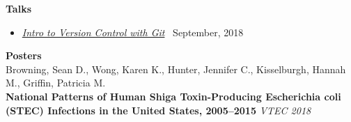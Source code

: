 \documentclass{resume}
\begin{document}
\textbf{Talks}

\begin{itemize}
  \item \href{https://beansrowning.github.io/git-talk}{\textit{Intro to Version Control with Git}} \, September, 2018 \\
\end{itemize}

\textbf{Posters} \\

Browning, Sean D., Wong, Karen K., Hunter, Jennifer C., Kisselburgh, Hannah M., Griffin, Patricia M. \\ 
\textbf{National Patterns of Human Shiga Toxin-Producing Escherichia coli (STEC) Infections in the United States, 2005–2015} \textit{VTEC 2018} \\



%
%
\end{document}
